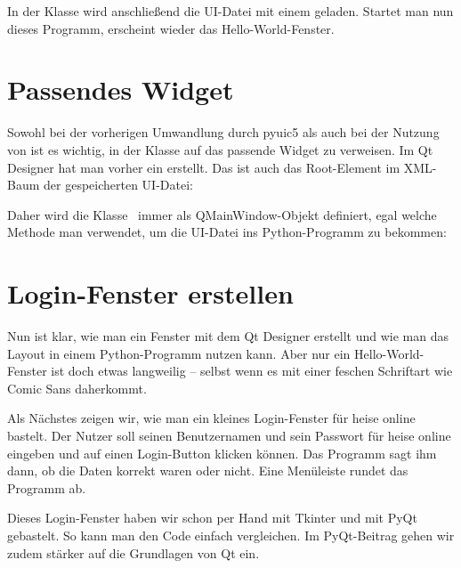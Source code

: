 In der Klasse  wird anschließend die UI-Datei mit einem  geladen. Startet man nun dieses Programm, erscheint wieder das Hello-World-Fenster.

\section{Passendes Widget}

Sowohl bei der vorherigen Umwandlung durch pyuic5 als auch bei der Nutzung von  ist es wichtig, in der Klasse  auf das passende Widget zu verweisen. Im Qt Designer hat man vorher ein  erstellt. Das  ist auch das Root-Element im XML-Baum der gespeicherten UI-Datei:

\medskip





\medskip

Daher wird die Klasse \ immer als QMainWindow-Objekt definiert, egal welche Methode man verwendet, um die UI-Datei ins Python-Programm zu bekommen:

\medskip



\section{Login-Fenster erstellen}

Nun ist klar, wie man ein Fenster mit dem Qt Designer erstellt und wie man das Layout in einem Python-Programm nutzen kann. Aber nur ein Hello-World-Fenster ist doch etwas langweilig – selbst wenn es mit einer feschen Schriftart wie Comic Sans daherkommt.

Als Nächstes zeigen wir, wie man ein kleines Login-Fenster für heise online bastelt. Der Nutzer soll seinen Benutzernamen und sein Passwort für heise online eingeben und auf einen Login-Button klicken können. Das Programm sagt ihm dann, ob die Daten korrekt waren oder nicht. Eine Menüleiste rundet das Programm ab.

Dieses Login-Fenster haben wir schon per Hand mit Tkinter und mit PyQt gebastelt. So kann man den Code einfach vergleichen. Im PyQt-Beitrag gehen wir zudem stärker auf die Grundlagen von Qt ein.

